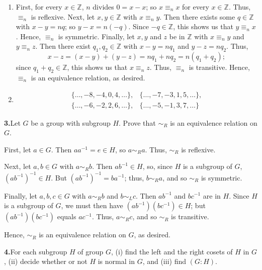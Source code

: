 \documentclass[10pt,]{book}
\theoremstyle{plain}
\theoremstyle{definition}
\theoremstyle{definition}
\theoremstyle{definition}
\theoremstyle{definition}
\numberwithin{equation}{section}
\def\Z{\mathbb{Z}}
\def\siml{\sim_L}
\def\simr{\sim_R}
\newcommand{\amp}{&}
\begin{document}
\begin{enumerate}[label=(\alph*)]
\item\hypertarget{li-421}{}First, for every \(x \in \Z\), \(n\) divides \(0=x-x\); so \(x\equiv_n x\) for every \(x\in
\Z\).  Thus, \(\equiv_n\) is reflexive. Next, let \(x,y \in \Z\) with \(x\equiv_n y\).  Then there exists some \(q\in \Z\) with \(x-y=nq\); so \(y-x=n(-q)\). Since \(-q\in \Z\), this shows us that \(y\equiv_n x\).  Hence, \(\equiv_n\) is symmetric. Finally, let \(x,y\) and \(z\) be in \(\Z\) with \(x\equiv_n
y\) and \(y\equiv_nz\).  Then there exist \(q_1,q_2 \in \Z\) with \(x-y=nq_1\) and \(y-z=nq_2\).  Thus,%
\begin{equation*}
x-z=(x-y)+(y-z)=nq_1+nq_2=n(q_1+q_2);
\end{equation*}
since \(q_1+q_2 \in \Z\), this shows us that \(x\equiv_n z\).  Thus, \(\equiv_n\) is transitive. Hence, \(\equiv_n\) is an equivalence relation, as desired.%
\item\hypertarget{li-422}{}%
\begin{align*}
\{\ldots,-8,-4,0,4,\ldots\},\amp 
\{\ldots,-7,-3,1,5,\ldots\},\\
\{\ldots,-6,-2,2,6,\ldots\},\amp 
\{\ldots,-5,-1,3,7,\ldots\}
\end{align*}
%
\end{enumerate}
\par\smallskip
\noindent\textbf{3.}\quad{}Let \(G\) be a group with subgroup \(H\). Prove that \(\simr\) is an equivalence relation on \(G\).%
\par\smallskip
First, let \(a\in G\). Then \(aa^{-1}=e\in H\), so \(a\simr a\). Thus, \(\simr\) is reflexive.%
\par
Next, let \(a,b\in G\) with \(a\simr b\). Then \(ab^{-1}\in H\), so, since \(H\) is a subgroup of \(G\), \((ab^{-1})^{-1}\in H\). But \((ab^{-1})^{-1}=ba^{-1}\); thus, \(b\simr a\), and so \(\simr\) is symmetric.%
\par
Finally, let \(a,b,c\in G\) with \(a\simr b\) and \(b\siml c\). Then \(ab^{-1}\) and \(bc^{-1}\) are in \(H\). Since \(H\) is a subgroup of \(G\), we must then have \((ab^{-1})(bc^{-1})\in H\); but \((ab^{-1})(bc^{-1})\) equals \(ac^{-1}\). Thus, \(a\simr c\), and so \(\simr\) is transitive.%
\par
Hence, \(\simr\) is an equivalence relation on \(G\), as desired.%
\par\smallskip
\noindent\textbf{4.}\quad{}For each subgroup \(H\) of group \(G\), (i) find the left and the right cosets of \(H\) in \(G\), (ii) decide whether or not \(H\) is normal in \(G\), and (iii) find \((G:H)\).%
\end{document}
